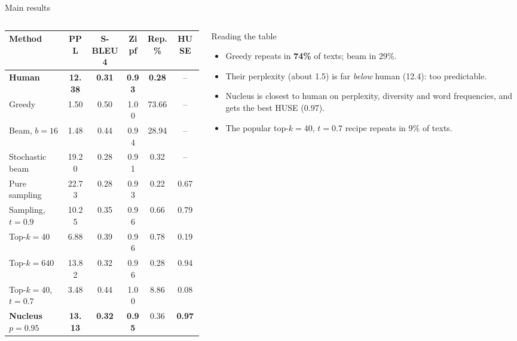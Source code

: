 \documentclass[aspectratio=169,11pt]{beamer}
\begin{document}
\begin{frame}{Main results}
  \begin{columns}[T]
    \begin{column}{0.6\textwidth}
      \scriptsize
      \begin{tabular}{@{}lccccc@{}}
        \toprule
        Method & PPL & S-BLEU4 & Zipf & Rep.\% & HUSE\\
        \midrule
        \textbf{Human} & \textbf{12.38} & \textbf{0.31} & \textbf{0.93} & \textbf{0.28} & --\\
        Greedy & 1.50 & 0.50 & 1.00 & 73.66 & --\\
        Beam, $b=16$ & 1.48 & 0.44 & 0.94 & 28.94 & --\\
        Stochastic beam & 19.20 & 0.28 & 0.91 & 0.32 & --\\
        Pure sampling & 22.73 & 0.28 & 0.93 & 0.22 & 0.67\\
        Sampling, $t=0.9$ & 10.25 & 0.35 & 0.96 & 0.66 & 0.79\\
        Top-$k=40$ & 6.88 & 0.39 & 0.96 & 0.78 & 0.19\\
        Top-$k=640$ & 13.82 & 0.32 & 0.96 & 0.28 & 0.94\\
        Top-$k=40$, $t=0.7$ & 3.48 & 0.44 & 1.00 & 8.86 & 0.08\\
        \textbf{Nucleus $p=0.95$} & \textbf{13.13} & \textbf{0.32} & \textbf{0.95} & 0.36 & \textbf{0.97}\\
        \bottomrule
      \end{tabular}
    \end{column}
    \begin{column}{0.36\textwidth}
      \begin{exampleblock}{Reading the table}
        \small
        \begin{itemize}
          \item Greedy repeats in \textbf{74\%} of texts; beam in 29\%.
          \item Their perplexity (about 1.5) is far \emph{below} human (12.4): too predictable.
          \item Nucleus is closest to human on perplexity, diversity and word frequencies, and gets the best HUSE (0.97).
          \item The popular top-$k=40$, $t=0.7$ recipe repeats in 9\% of texts.
        \end{itemize}
      \end{exampleblock}
    \end{column}
  \end{columns}
\end{frame}
\end{document}
